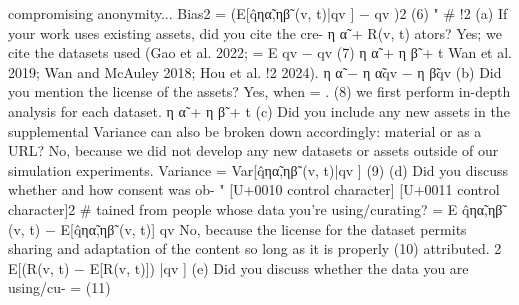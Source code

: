 \documentclass[10pt]{article}
\begin{document}
\begin{ReviewVerbatim}
   compromising anonymity...                                                       Bias2 = (E[q̂ηα̃,ηβ̃ (v, t)|qv ] − qv )2                        (6)
                                                                                                "                     #     !2
 (a) If your work uses existing assets, did you cite the cre-                                     η α̃ + R(v, t)
      ators? Yes; we cite the datasets used (Gao et al. 2022;                            = E                        qv − qv                        (7)
                                                                                                  η α̃ + η β̃ + t
      Wan et al. 2019; Wan and McAuley 2018; Hou et al.
                                                                                                                      !2
      2024).                                                                                 η α̃ − η α̃qv − η β̃qv
 (b) Did you mention the license of the assets? Yes, when                                =                                .                        (8)
      we first perform in-depth analysis for each dataset.                                        η α̃ + η β̃ + t
 (c) Did you include any new assets in the supplemental                     Variance can also be broken down accordingly:
      material or as a URL? No, because we did not develop
      any new datasets or assets outside of our simulation
      experiments.                                                          Variance = Var[q̂ηα̃,ηβ̃ (v, t)|qv ]                    (9)
 (d) Did you discuss whether and how consent was ob-                                     "
                                                                                           [U+0010 control character]                                   [U+0011 control character]2
                                                                                                                                   #
      tained from people whose data you’re using/curating?                           = E q̂ηα̃,ηβ̃ (v, t) − E[q̂ηα̃,ηβ̃ (v, t)] qv
      No, because the license for the dataset permits sharing
      and adaptation of the content so long as it is properly                                                                                 (10)
      attributed.                                                                                                           2
                                                                                        E[(R(v, t) − E[R(v, t)]) |qv ]
 (e) Did you discuss whether the data you are using/cu-                               =                                                       (11)

\end{ReviewVerbatim}
\end{document}
